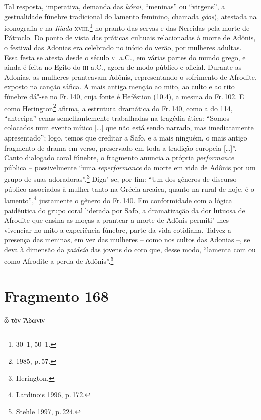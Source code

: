 \pagebreak
Tal resposta, imperativa, demanda das \textit{kórai}, ``meninas'' ou ``virgens'', a gestualidade fúnebre tradicional do lamento feminino, chamada \textit{góos}), atestada na iconografia e na \textit{Ilíada} \textsc{xviii},\footnote{30--1, 50--1.} no pranto das servas e das Nereidas pela morte de Pátroclo.
Do ponto de vista das práticas cultuais relacionadas à morte de Adônis, o festival das Adonias  
era celebrado no início do verão, por mulheres adultas. Essa festa se atesta 
desde o século \textsc{vi} a.C., em várias partes do
mundo grego, e ainda é feita no Egito do \textsc{iii} a.C., agora de modo público e
oficial. Durante as Adonias, as mulheres pranteavam Adônis, representando o
sofrimento de Afrodite, exposto na canção sáfica. A mais antiga
menção ao mito, ao culto e ao rito fúnebre dá"-se no Fr.\,140, cuja fonte é
Heféstion (10.4), a mesma do Fr.\,102. E como Herington\footnote{1985, p.\,57.} afirma, a estrutura dramática do Fr.\,140,  como a do 114, ``antecipa'' cenas semelhantemente trabalhadas na tragédia ática: ``Somos colocados num evento mítico [\ldots{}] que não está sendo narrado, mas imediatamente apresentado''; logo,  temos que creditar a Safo, e a mais ninguém, o mais antigo fragmento de drama em verso, preservado em toda a tradição europeia [\ldots{}]''. Canto dialogado coral fúnebre, o fragmento anuncia a própria \textit{performance} pública -- possivelmente ``uma \textit{reperformance} da morte em vida de Adônis por um grupo de suas adoradoras''.\footnote{Herington.} Diga"-se, por fim: ``Um dos gêneros de discurso público associados à mulher tanto na Grécia arcaica, quanto na rural de hoje, é o lamento'',\footnote{Lardinois 1996, p.\,172.} justamente o gênero do Fr.\,140. Em conformidade com a lógica
paidêutica do grupo coral liderada por Safo, a dramatização da dor lutuosa de Afrodite que ensina as moças a prantear a morte de Adônis permiti"-lhes vivenciar no mito a experiência fúnebre, parte da vida cotidiana. Talvez a presença das meninas, em vez das mulheres -- como nos cultos das Adonias --, se deva à dimensão da \textit{paideía} das jovens do coro que, desse modo, ``lamenta com ou como Afrodite a perda de Adônis''.\footnote{Stehle 1997, p.\,224.}

\section{Fragmento 168}

\begin{gkverse}
ὦ τὸν Ἄδωνιν
\end{gkverse}

